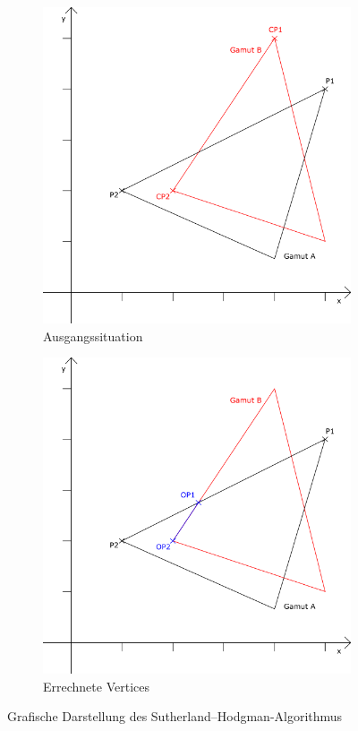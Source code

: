 \documentclass[11pt]{scrartcl}
\begin{document}
\begin{figure}[H]
    \centering
    \begin{subfigure}[b]{.49\textwidth}
        \includegraphics[width=\textwidth]{images/sutherland_hodgman_example.png}
        \caption{Ausgangssituation}
    \end{subfigure}
    \hfill 
    \begin{subfigure}[b]{.49\textwidth}
        \includegraphics[width=\textwidth]{images/sutherland_hodgman_example_solution.png}
        \caption{Errechnete Vertices}
    \end{subfigure}
    \caption{Grafische Darstellung des Sutherland–Hodgman-Algorithmus} \label{fig:sutherland_hodgman}
\end{figure}
\end{document}
